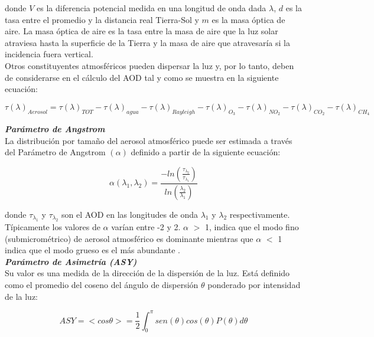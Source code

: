 donde $V$ es la diferencia potencial medida en una longitud de onda dada $\lambda$, $d$ es la tasa entre el promedio y la distancia real Tierra-Sol y $m$ es la masa óptica de aire. La masa óptica de aire es la tasa entre la masa de aire que la luz solar atraviesa hasta la superficie de la Tierra y la masa de aire que atravesaría si la incidencia fuera vertical.\\

Otros constituyentes atmosféricos pueden dispersar la luz y, por lo tanto, deben de considerarse en el cálculo del AOD \citep{Holben1998} tal y como se muestra en la siguiente ecuación:

\begin{equation}
\tau (\lambda)_{Aerosol} = \tau (\lambda)_{TOT} - \tau (\lambda)_{agua} - \tau (\lambda)_{Rayleigh} - \tau (\lambda)_{O_3} - \tau (\lambda)_{NO_2} - \tau (\lambda)_{CO_2} - \tau (\lambda)_{CH_4}
\end{equation}

\newpage

\textit{\textbf{Parámetro de Angstrom}}\\

La distribución por tamaño del aerosol atmosférico puede ser estimada a través del Parámetro de Angstrom $(\alpha)$ \citep{Holben1998} definido a partir de la siguiente ecuación:

\begin{equation}
\alpha (\lambda_1, \lambda_2) = \frac {-ln (\frac{\tau_\lambda_2}{\tau_\lambda_1})}{ ln(\frac{\lambda_2}{\lambda_1})}
\end{equation}

donde $\tau_\lambda_1$ y $\tau_\lambda_2$ son el AOD en las longitudes de onda $\lambda_1$ y $\lambda_2$ respectivamente. Típicamente los valores de $\alpha$ varían entre -2 y 2.  $\alpha$ $>$ 1, indica que el modo fino (submicrométrico) de aerosol atmosférico es dominante mientras que  $\alpha$ $<$ 1 indica que el modo grueso es el más abundante \citep{Carabali2017}.\\

\textit{\textbf{Parámetro de Asimetría (ASY)}}\\

Su valor es una medida de la dirección de la dispersión de la luz. Está definido como el promedio del coseno del ángulo de dispersión $\theta$ ponderado por intensidad de la luz:

\begin{equation}
ASY = < cos \theta > = \frac{1}{2} \int_{0}^{\pi} sen (\theta) cos(\theta) P(\theta) d\theta
\end{equation}

